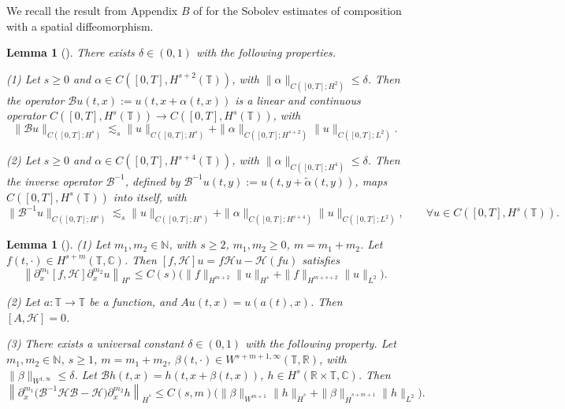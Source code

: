 \documentclass[12pt]{amsart}
\newtheorem{lemma}[theorem]{Lemma}
\theoremstyle{remark}
\theoremstyle{definition}
\numberwithin{equation}{section}
\newcommand{\R}{\mathbb{R}}
\newcommand{\mB}{\mathcal{B}}
\begin{document}
We recall the result from Appendix $B$ of \cite{BHM}  for the Sobolev estimates of composition with a spatial diffeomorphism.
\begin{lemma}[\hspace{1sp}\cite{BHM}] \label{t:BaldiLemma}
There exists $\delta \in (0, 1)$ with the following properties.

(1) \textit{Let $s \geq 0$ and $\alpha \in C([0, T], H^{s+2}(\mathbb{T}))$, with $\|\alpha\|_{C([0,T];H^2)} \leq \delta$. Then the operator $\mathcal{B}u(t, x) := u(t, x + \alpha(t, x))$ is a linear and continuous operator $C([0, T], H^s(\mathbb{T})) \to C([0, T], H^s(\mathbb{T}))$, with}
\begin{equation} \label{BtransformBound}
    \|\mathcal{B}u\|_{C([0,T];H^s)} \lesssim_s \|u\|_{C([0,T];H^s)} + \|\alpha\|_{C([0,T];H^{s+2})}\|u\|_{C([0,T];L^2)}. 
\end{equation}

(2) \textit{Let $s \geq 0$ and $\alpha \in C([0, T], H^{s+4}(\mathbb{T}))$, with $\|\alpha\|_{C([0,T];H^4)} \leq \delta$. Then the inverse operator $\mathcal{B}^{-1}$, defined by $\mathcal{B}^{-1}u(t, y) := u(t, y + \widetilde{\alpha}(t, y))$, maps $C([0, T], H^s(\mathbb{T}))$ into itself, with}
\[
    \|\mathcal{B}^{-1}u\|_{C([0,T];H^s)} \lesssim_s \|u\|_{C([0,T];H^s)} + \|\alpha\|_{C([0,T];H^{s+4})}\|u\|_{C([0,T];L^2)}, \qquad \forall u \in C([0, T], H^s(\mathbb{T})) .
\]
\end{lemma}


\begin{lemma}[\hspace{1sp}\cite{MR3011291}] \label{t:BaldiCommutator}
(1) Let $m_1, m_2 \in \mathbb{N}$, with $s \geqslant 2$, $m_1, m_2 \geqslant 0$, $m = m_1 + m_2$. Let $f(t, \cdot) \in H^{s+m}(\mathbb{T}, \mathbb{C})$. Then $[f, \mathcal{H}]u = f\mathcal{H}u - \mathcal{H}(fu)$ satisfies
\begin{equation} \label{HilbertCommutator}
 \left\| \partial_x^{m_1} [f, \mathcal{H}] \partial_x^{m_2} u \right\|_{H^s} \leqslant C(s) \bigl( \|f\|_{H^{m+2}}\|u\|_{H^s}  + \|f\|_{H^{m+s+2}}\|u\|_{L^2}  \bigr).   
\end{equation}

\noindent (2) Let $a : \mathbb{T} \to \mathbb{T}$ be a function, and $Au(t, x) = u(a(t), x)$. Then $[A, \mathcal{H}] = 0$.

\noindent (3) There exists a universal constant $\delta \in (0, 1)$ with the following property. Let $m_1, m_2 \in \mathbb{N}$, $s\geq 1$, $m = m_1 + m_2$, $\beta(t, \cdot) \in W^{s+m+1, \infty}(\mathbb{T}, \mathbb{R})$, with $\|\beta\|_{W^{1,\infty}} \leqslant \delta$. Let $\mB h(t, x) = h(t, x + \beta(t, x))$, $h \in H^s(\R \times\mathbb{T}, \mathbb{C})$. Then
\begin{equation} \label{BConjugationDiff}
\left\| \partial_x^{m_1} \bigl( \mB^{-1}\mathcal{H} \mB - \mathcal{H} \bigr) \partial_x^{m_2} h \right\|_{\dot{H}^s} \leqslant C(s, m) \bigl( \|\beta\|_{W^{m+1}} \|h\|_{\dot{H}^s} + \|\beta\|_{\dot{H}^{s+m+1}} \|h\|_{L^2} \bigr).
\end{equation}
\end{lemma}
\end{document}
